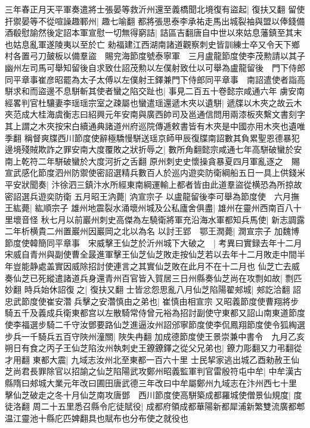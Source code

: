 三年春正月天平軍奏遣將士張晏等救沂州還至義橋聞北境復有盜起|{
	復扶又翻}
留使扞禦晏等不從喧譟趣鄆州|{
	趣七喻翻}
都將張思泰李承祐走馬出城裂袖與盟以俸錢備酒殽慰諭然後定詔本軍宣慰一切無得窮詰|{
	詰區吉翻唐自中世以來姑息藩鎮至其末也姑息亂軍遂陵夷以至於亡}
勑福建江西湖南諸道觀察刺史皆訓練士卒又令天下鄉村各置弓刀皷板以備羣盜　賜兖海節度號泰寧軍　三月盧龍節度使李茂勲請以其子幽州左司馬可舉知留後自求致仕詔茂勲以左僕射致仕以可舉為盧龍留後　門下侍郎同平章事崔彦昭罷為太子太傅以左僕射王鐸兼門下侍郎同平章事　南詔遣使者詣高駢求和而盜邊不息駢斬其使者蠻之陷交趾也|{
	事見二百五十卷懿宗咸通六年}
虜安南經畧判官杜驤妻李瑶瑶宗室之疎屬也蠻遣瑶還遞木夾以遺駢|{
	遞牒以木夾之故云木夾范成大桂海虞衡志曰紹興元年安南與廣西帥司及邕通信問用兩漆板夾繫文書刻字其上謂之木夾按宋白續通典諸道州府巡院傳逓敕書皆有木夾是中國亦用木夾也遺唯季翻}
稱督爽牒西川節度使辭極驕慢駢送瑶京師甲辰復牒南詔數其負累聖恩德暴犯邊境殘賊欺詐之罪安南大度覆敗之狀折辱之|{
	數所角翻懿宗咸通七年高駢破蠻於安南上乾符二年駢破蠻於大度河折之舌翻}
原州刺史史懷操貪暴夏四月軍亂逐之　賜宣武感化節度泗州防禦使密詔選精兵數百人於巡内遊奕防衛綱船五日一具上供錢米平安狀聞奏|{
	汴徐泗三鎮汴水所經東南綱運輸上都者皆由此道羣盜從横恐為所掠故密詔選兵遊奕防衛}
五月昭王汭薨|{
	汭宣宗子}
以盧龍留後李可舉為節度使　六月撫王紘薨|{
	紘順宗子}
雄州地震裂水涌壞州城及公私廬舍俱盡|{
	雄州在靈州西南百八十里壞音怪}
秋七月以前巖州刺史高傑為左驍衛將軍充沿海水軍都知兵馬使|{
	新志調露二年析横貴二州置巖州因巖岡之北以為名}
以討王郢　鄂王潤薨|{
	潤宣宗子}
加魏博節度使韓簡同平章事　宋威擊王仙芝於沂州城下大破之　|{
	考異曰實録去年十二月宋威自青州與副使曹全晸進軍擊王仙芝仙芝敗走按仙芝若以去年十二月敗走中間半年豈能静處盖實因威除招討使連言之其實仙芝敗在此月不在十二月也}
仙芝亡去威奏仙芝已死縱遣諸道兵身還青州百官皆入賀居三日州縣奏仙芝尚在攻剽如故|{
	剽匹妙翻}
時兵始休詔復之|{
	復扶又翻}
士皆忿怨思亂八月仙芝陷陽翟郟城|{
	郟訖洽翻}
詔忠武節度使崔安濳兵擊之安濳慎由之弟也|{
	崔慎由相宣宗}
又昭義節度使曹翔將步騎五千及義成兵衛東都宫以左散騎常侍曾元裕為招討副使守東都又詔山南東道節度使李福選步騎二千守汝鄧要路仙芝進逼汝州詔邠寧節度使李侃鳳翔節度使令狐綯選步兵一千騎兵五百守陜州潼關|{
	陜失冉翻}
加成德節度使王景崇兼中書令　九月乙亥朔日有食之丙子王仙芝陷汝州執刺史王鐐鐐鐸之從父兄弟也|{
	鐐力彫翻又力弔翻從才用翻}
東都大震|{
	九域志汝州北至東都一百六十里}
士民挈家逃出城乙酉勑赦王仙芝尚君長罪除官以招諭之仙芝陷陽武攻鄭州昭義監軍判官雷殷符屯中牟|{
	中牟漢古縣隋曰郟城大業元年改曰圃田唐武德三年改曰中牟屬鄭州九域志在汴州西七十里}
擊仙芝破走之冬十月仙芝南攻唐鄧　西川節度使高駢築成都羅城使僧景仙規度|{
	度徒洛翻}
周二十五里悉召縣令庀徒賦役|{
	成都府領成都華陽新都犀浦新繁雙流廣都郫温江靈池十縣庀匹婢翻具也賦布也分布使之就役也}
